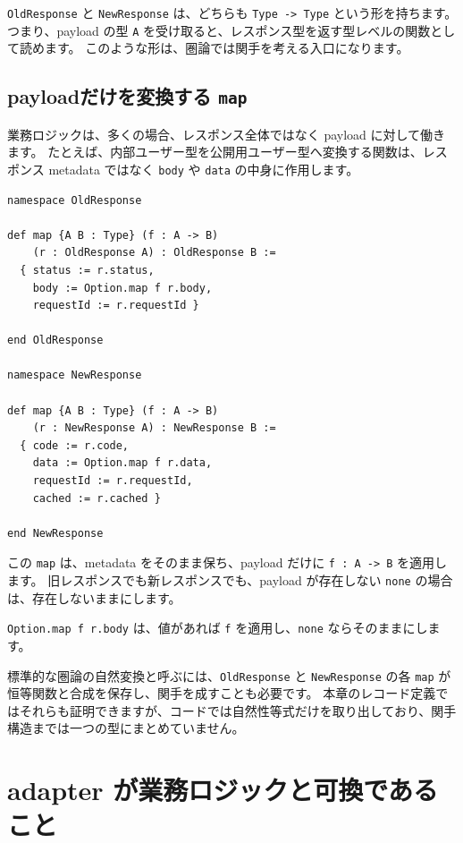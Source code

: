 \texttt{OldResponse} と \texttt{NewResponse} は、どちらも \texttt{Type -> Type} という形を持ちます。
つまり、payload の型 \texttt{A} を受け取ると、レスポンス型を返す型レベルの関数として読めます。
このような形は、圏論では関手を考える入口になります。

\subsection{payloadだけを変換する \texttt{map}}

業務ロジックは、多くの場合、レスポンス全体ではなく payload に対して働きます。
たとえば、内部ユーザー型を公開用ユーザー型へ変換する関数は、レスポンス metadata ではなく \texttt{body} や \texttt{data} の中身に作用します。

\begin{listing}[htbp]
\begin{verbatim}
namespace OldResponse

def map {A B : Type} (f : A -> B)
    (r : OldResponse A) : OldResponse B :=
  { status := r.status,
    body := Option.map f r.body,
    requestId := r.requestId }

end OldResponse

namespace NewResponse

def map {A B : Type} (f : A -> B)
    (r : NewResponse A) : NewResponse B :=
  { code := r.code,
    data := Option.map f r.data,
    requestId := r.requestId,
    cached := r.cached }

end NewResponse
\end{verbatim}
\caption{\texttt{OldResponse.map} と \texttt{NewResponse.map}}
\label{lst:ch31-response-map}
\end{listing}

この \texttt{map} は、metadata をそのまま保ち、payload だけに \texttt{f : A -> B} を適用します。
旧レスポンスでも新レスポンスでも、payload が存在しない \texttt{none} の場合は、存在しないままにします。

\texttt{Option.map f r.body} は、値があれば \texttt{f} を適用し、\texttt{none} ならそのままにします。

標準的な圏論の自然変換と呼ぶには、\texttt{OldResponse} と \texttt{NewResponse} の各 \texttt{map} が恒等関数と合成を保存し、関手を成すことも必要です。
本章のレコード定義ではそれらも証明できますが、コードでは自然性等式だけを取り出しており、関手構造までは一つの型にまとめていません。

\section{adapter が業務ロジックと可換であること}

